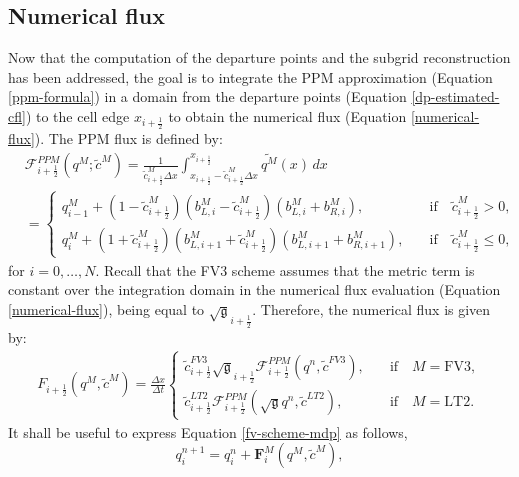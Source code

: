 \documentclass[preprint,12pt]{elsarticle}
\begin{document}
\begin{linenumbers}
\subsection{Numerical flux}
Now that the computation of the departure points and the subgrid reconstruction has been addressed, the goal is to integrate the PPM approximation (Equation \eqref{ppm-formula}) in a domain from the departure points (Equation \eqref{dp-estimated-cfl}) to the cell edge $x_{i+\frac{1}{2}}$ to obtain the numerical flux (Equation \eqref{numerical-flux}).
The PPM flux is defined by:
\begin{align*}
	&\mathcal{F}_{i+\frac{1}{2}}^{PPM} ({{q}^M;\tilde{c}^{M}})=
	\frac{1}{\tilde{c}^M_{i+\frac{1}{2}} \Delta x}
	\int_{x_{i+\frac{1}{2}}-\tilde{c}^M_{i+\frac{1}{2}} \Delta x}^{x_{i+\frac{1}{2}}} \widetilde{q^M}(x) \,dx
	\\
	&=
	\begin{cases}
		{q}_{i-1}^{M}+
		(1-\tilde{c}_{i+\frac{1}{2}}^{M})
		(b_{L,i}^M-\tilde{c}_{i+\frac{1}{2}}^{M})
		(b_{L,i}^M+b_{R,i}^M),
		\quad &\text{if} \quad \tilde{c}_{i+\frac{1}{2}}^{M}>0,\\
		{q}_{i}^{M}+
		(1+\tilde{c}_{i+\frac{1}{2}}^{M})
		(b_{L,i+1}^M+\tilde{c}_{i+\frac{1}{2}}^{M})
		(b_{L,i+1}^M+b_{R,i+1}^M),
		\quad &\text{if} \quad \tilde{c}_{i+\frac{1}{2}}^{M}\leq0,
	\end{cases}
\end{align*}
for $i=0, \ldots, N$.
Recall that the FV3 scheme assumes that the metric term is constant over the integration domain in the numerical flux evaluation (Equation \eqref{numerical-flux}), being equal to  $\sqrt{\mathfrak{g}}_{i+\frac{1}{2}}$.
Therefore, the numerical flux  is given by:
\begin{align}
	{F}_{i+\frac{1}{2}} (q^M,\tilde{c}^{M})=
	\frac{\Delta x}{\Delta t}
	\begin{cases}
		\tilde{{c}}^{FV3}_{i+\frac{1}{2}} \sqrt{\mathfrak{g}}_{i+\frac{1}{2}} \mathcal{F}_{i+\frac{1}{2}}^{PPM}
		({{q}^n,\tilde{c}^{FV3}}),
		\quad &\text{if} \quad M=\text{FV3},\\
		\tilde{{c}}^{LT2}_{i+\frac{1}{2}} \mathcal{F}_{i+\frac{1}{2}}^{PPM}({{\sqrt{\mathfrak{g}}q}^n,\tilde{c}^{LT2}}),
		\quad &\text{if} \quad M=\text{LT2}.
	\end{cases}
\end{align}
It shall be useful to 
express Equation \eqref{fv-scheme-mdp} as follows,
\begin{equation}
	\label{1d-fv-scheme2}
	{q}^{n+1}_{i} = {q}^n_{i} +\mathbf{F}_{i}^M(q^M,\tilde{c}^{M}),

\end{equation}
\end{linenumbers}
\end{document}
